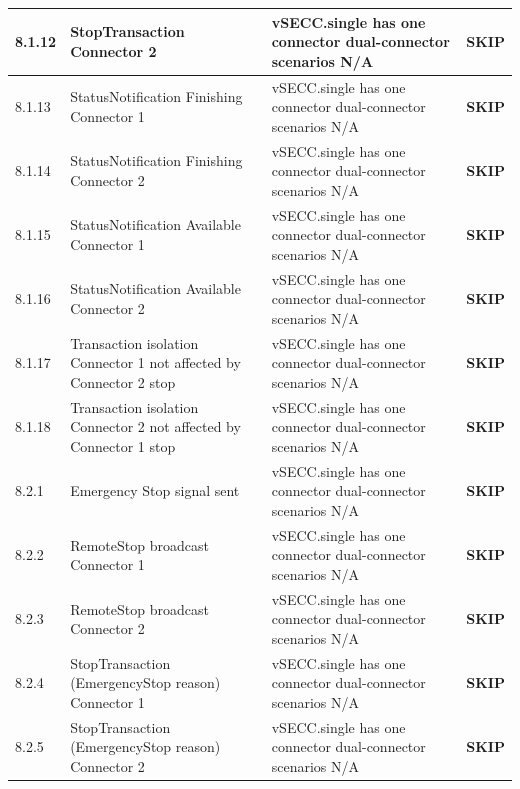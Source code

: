 \documentclass[10pt, a4paper]{article}
\begin{document}
\begin{longtable}{|L{1cm}|L{5.5cm}|M{7cm}|C{1.8cm}|}
\hline
\small 8.1.12 & \small StopTransaction  Connector 2 & vSECC.single has one connector  dual-connector scenarios N/A & \textcolor{skipgray}{\textbf{SKIP}} \\
\hline
\small 8.1.13 & \small StatusNotification Finishing  Connector 1 & vSECC.single has one connector  dual-connector scenarios N/A & \textcolor{skipgray}{\textbf{SKIP}} \\
\hline
\small 8.1.14 & \small StatusNotification Finishing  Connector 2 & vSECC.single has one connector  dual-connector scenarios N/A & \textcolor{skipgray}{\textbf{SKIP}} \\
\hline
\small 8.1.15 & \small StatusNotification Available  Connector 1 & vSECC.single has one connector  dual-connector scenarios N/A & \textcolor{skipgray}{\textbf{SKIP}} \\
\hline
\small 8.1.16 & \small StatusNotification Available  Connector 2 & vSECC.single has one connector  dual-connector scenarios N/A & \textcolor{skipgray}{\textbf{SKIP}} \\
\hline
\small 8.1.17 & \small Transaction isolation  Connector 1 not affected by Connector 2 stop & vSECC.single has one connector  dual-connector scenarios N/A & \textcolor{skipgray}{\textbf{SKIP}} \\
\hline
\small 8.1.18 & \small Transaction isolation  Connector 2 not affected by Connector 1 stop & vSECC.single has one connector  dual-connector scenarios N/A & \textcolor{skipgray}{\textbf{SKIP}} \\
\hline
\small 8.2.1 & \small Emergency Stop signal sent & vSECC.single has one connector  dual-connector scenarios N/A & \textcolor{skipgray}{\textbf{SKIP}} \\
\hline
\small 8.2.2 & \small RemoteStop broadcast  Connector 1 & vSECC.single has one connector  dual-connector scenarios N/A & \textcolor{skipgray}{\textbf{SKIP}} \\
\hline
\small 8.2.3 & \small RemoteStop broadcast  Connector 2 & vSECC.single has one connector  dual-connector scenarios N/A & \textcolor{skipgray}{\textbf{SKIP}} \\
\hline
\small 8.2.4 & \small StopTransaction (EmergencyStop reason)  Connector 1 & vSECC.single has one connector  dual-connector scenarios N/A & \textcolor{skipgray}{\textbf{SKIP}} \\
\hline
\small 8.2.5 & \small StopTransaction (EmergencyStop reason)  Connector 2 & vSECC.single has one connector  dual-connector scenarios N/A & \textcolor{skipgray}{\textbf{SKIP}} \\

\end{longtable}
\end{document}
